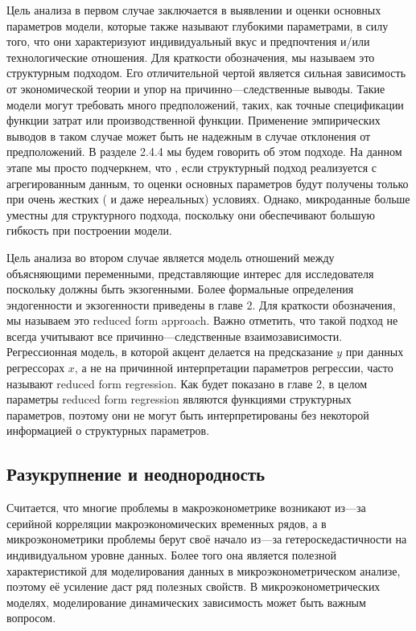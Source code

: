 	
	Цель анализа в первом случае заключается в выявлении и оценки основных параметров модели, которые также называют глубокими параметрами, в силу того, что они характеризуют индивидуальный вкус и предпочтения и/или технологические отношения. Для краткости обозначения, мы называем это структурным подходом. Его отличительной чертой является сильная зависимость от экономической теории и упор на причинно---следственные выводы. Такие модели могут требовать много предположений, таких, как точные спецификации функции затрат или производственной функции. Применение эмпирических выводов в таком случае может быть не надежным в случае отклонения от предположений. В разделе 2.4.4 мы будем говорить об этом подходе. На данном этапе мы просто подчеркнем, что , если структурный подход реализуется с агрегированным данным, то оценки основных параметров будут получены только при очень жестких ( и даже нереальных) условиях. Однако, микроданные больше уместны для структурного подхода, поскольку они обеспечивают большую гибкость при построении модели.
	
	
	Цель анализа во втором случае является модель отношений между объясняющими переменными, представляющие интерес для исследователя поскольку должны быть экзогенными. Более формальные определения эндогенности и экзогенности приведены в главе 2. Для краткости обозначения, мы называем это reduced form approach. Важно отметить, что такой подход не всегда учитывают все причинно---следственные взаимозависимости. Регрессионная модель, в которой акцент делается на предсказание $y$ при данных регрессорах $x$, а не на причинной интерпретации параметров регрессии, часто называют reduced form regression. Как будет показано в главе 2, в целом параметры reduced form regression являются функциями структурных параметров, поэтому они не могут быть интерпретированы без некоторой информацией о структурных параметров.



\subsection{Разукрупнение и неоднородность}

	Считается, что многие проблемы в макроэконометрике возникают из---за серийной корреляции макроэкономических временных рядов, а в микроэконометрики проблемы берут своё начало из---за гетероскедастичности на индивидуальном уровне данных. Более того она является полезной характеристикой для моделирования данных в микроэконометрическом анализе, поэтому её усиление даст ряд полезных свойств. В  микроэконометрических моделях, моделирование динамических зависимость может быть важным вопросом.
	
